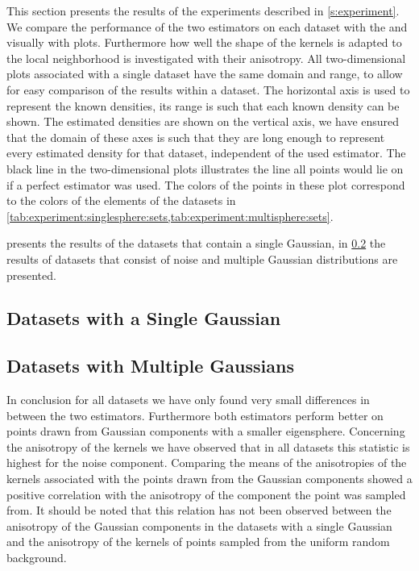 
This section presents the results of the experiments described in \cref{s:experiment}. 
We compare the performance of the two estimators on each dataset with the \mse and visually with plots. Furthermore how well the shape of the kernels is adapted to the local neighborhood is investigated with their anisotropy.
	All two-dimensional plots associated with a single dataset have the same domain and range, to allow for easy comparison of the results within a dataset. The horizontal axis is used to represent the known densities, its range is such that each known density can be shown. The estimated densities are shown on the vertical axis, we have ensured that the domain of these axes is such that they are long enough to represent every estimated density for that dataset, independent of the used estimator. 
	The black line in the two-dimensional plots illustrates the line all points would lie on if a perfect estimator was used.
	The colors of the points in these plot correspond to the colors of the elements of the datasets in \cref{tab:experiment:singlesphere:sets,tab:experiment:multisphere:sets}.

	 presents the results of the datasets that contain a single Gaussian, in \cref{s:results:multipleGaussian} the results of datasets that consist of noise and multiple Gaussian distributions are presented. 

\subsection{Datasets with a Single Gaussian}
\label{s:results:singleGaussian}


\subsection{Datasets with Multiple Gaussians}
\label{s:results:multipleGaussian}


	In conclusion for all datasets we have only found very small differences in \mse between the two estimators. 
	Furthermore both estimators perform better on points drawn from Gaussian components with a smaller eigensphere. 
	Concerning the anisotropy of the kernels we have observed that in all datasets this statistic is highest for the noise component. 
	Comparing the means of the anisotropies of the kernels associated with the points drawn from the Gaussian components showed a positive correlation with the anisotropy of the component the point was sampled from. It should be noted that this relation has not been observed between the anisotropy of the Gaussian components in the datasets with a single Gaussian and the anisotropy of the kernels of points sampled from the uniform random background.